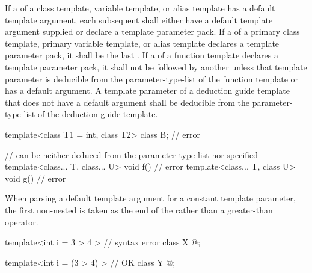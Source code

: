 \pnum
If a 
of a class template, variable template, or alias template has
a default template argument,
each subsequent 
shall either have a default template argument supplied or
declare a template parameter pack.
If a  of
a primary class template, primary variable template, or alias template
declares a template parameter pack,
it shall be the last .
If a  of a function template
declares a template parameter pack, it
shall not be followed by another 
unless that template parameter is deducible from the
parameter-type-list of the function template or
has a default argument.
A template parameter of a deduction guide template
that does not have a default argument shall be deducible
from the parameter-type-list of the deduction guide template.
\begin{example}
\begin{codeblock}
template<class T1 = int, class T2> class B;     // error

//  can be neither deduced from the parameter-type-list nor specified
template<class... T, class... U> void f() { }   // error
template<class... T, class U> void g() { }      // error
\end{codeblock}
\end{example}

%
\pnum
When parsing a default template argument
for a constant template parameter,
the first non-nested \tcode{>} is taken as
the end of the 
rather than a greater-than operator.
\begin{example}
\begin{codeblock}
template<int i = 3 > 4 >        // syntax error
class X { @\commentellip@ };

template<int i = (3 > 4) >      // OK
class Y { @\commentellip@ };
\end{codeblock}
\end{example}


